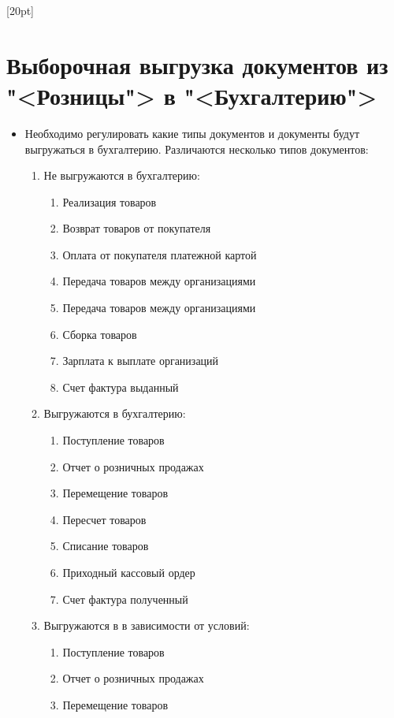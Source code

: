 [20pt]
\section{Выборочная выгрузка документов из "<Розницы"> в "<Бухгалтерию">}
\begin {itemize}	
\item Необходимо регулировать какие типы документов и документы будут выгружаться в бухгалтерию. Различаются несколько типов документов:
\begin{enumerate}
	\item Не выгружаются в бухгалтерию:
	\begin{enumerate}[I]
		\item Реализация товаров
		\item Возврат товаров от покупателя
		\item Оплата от покупателя платежной картой
		\item Передача товаров между организациями
		\item Передача товаров между организациями
		\item Сборка товаров
		\item Зарплата к выплате организаций
		\item Счет фактура выданный
	\end{enumerate}
	\item Выгружаются в бухгалтерию:
	\begin{enumerate}[I]
		\item Поступление товаров
		\item Отчет о розничных продажах
		\item Перемещение товаров
		\item Пересчет товаров
		\item Списание товаров
		\item Приходный кассовый ордер
		\item Счет фактура полученный
	\end{enumerate}
	\item Выгружаются в в зависимости от условий:
	\begin{enumerate}[I]
		\item Поступление товаров
		\item Отчет о розничных продажах
		\item Перемещение товаров

\end{enumerate}
\end{enumerate}
\end{itemize}
